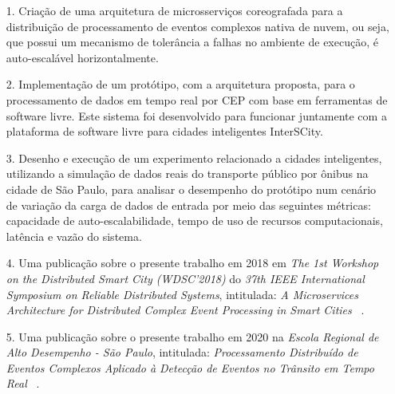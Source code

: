 \begin{itemize}
  \item[1.] Criação de uma arquitetura de microsserviços coreografada para a distribuição de processamento de eventos complexos nativa de nuvem, ou seja, que possui um mecanismo de tolerância a falhas no ambiente de execução, é auto-escalável horizontalmente. %

  
  \item[2.] Implementação de um protótipo, com a arquitetura proposta, para o processamento de dados em tempo real por CEP com base em ferramentas de software livre. Este sistema foi desenvolvido para funcionar juntamente com a plataforma de software livre para cidades inteligentes InterSCity. %
  
  
  \item[3.] Desenho e execução de um experimento relacionado a cidades inteligentes, utilizando a simulação de dados reais do transporte público por ônibus na cidade de São Paulo, para analisar o desempenho do protótipo num cenário de variação da carga de dados de entrada por meio das seguintes métricas: capacidade de auto-escalabilidade, tempo de uso de recursos computacionais, latência e vazão do sistema.%
  
  \item[4.] Uma publicação sobre o presente trabalho em 2018 em \textit{The 1st Workshop on the Distributed Smart City (WDSC'2018)} do \textit{37th IEEE International Symposium on Reliable Distributed Systems}, intitulada: \textit{A Microservices Architecture for Distributed Complex Event Processing in Smart Cities} ~\citep{8615650}.
  
  \item[5.] Uma publicação sobre o presente trabalho em 2020 na \textit{Escola Regional de Alto Desempenho - São Paulo}, intitulada: \textit{Processamento Distribuído de Eventos Complexos Aplicado à Detecção de Eventos no Trânsito em Tempo Real} ~\citep{scattone2020cep}. 


\end{itemize}
